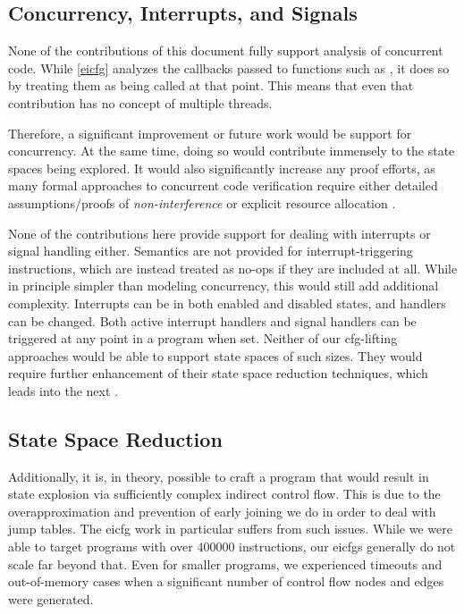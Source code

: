 \subsection{Concurrency, Interrupts, and Signals}
None of the contributions of this document fully support analysis of concurrent code.
While \cref{eicfg} analyzes the callbacks passed to functions such as , it does so by treating them as being called at that point.
This means that even that contribution has no concept of multiple threads.

Therefore, a significant improvement or future work would be support for concurrency.
At the same time, doing so would contribute immensely to the state spaces being explored.
It would also significantly increase any proof efforts, as many formal approaches to concurrent code verification require either detailed assumptions/proofs of \emph{non-interference} \autocite{owicki1976gries} or explicit resource allocation \autocite{xu1997rely-guarantee}.

None of the contributions here provide support for dealing with interrupts or signal handling either.
Semantics are not provided for interrupt-triggering instructions, which are instead treated as no-ops if they are included at all.
While in principle simpler than modeling concurrency, this would still add additional complexity.
Interrupts can be in both enabled and disabled states, and handlers can be changed.
Both active interrupt handlers and signal handlers can be triggered at any point in a program when set.
Neither of our \gls{cfg}-lifting approaches would be able to support state spaces of such sizes.
They would require further enhancement of their state space reduction techniques, which leads into the next .

\subsection{State Space Reduction}\label{conclusion-state-space}
Additionally, it is, in theory, possible to craft a program that would result in state explosion via sufficiently complex indirect control flow.
This is due to the overapproximation and prevention of early joining we do in order to deal with jump tables.
The \gls{eicfg} work in particular suffers from such issues.
While we were able to target programs with over \num{400000} instructions, our \glspl{eicfg} generally do not scale far beyond that.
Even for smaller programs, we experienced timeouts and out-of-memory cases when a significant number of control flow nodes and edges were generated.

